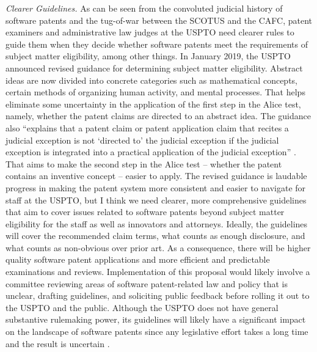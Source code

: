 \documentclass[12pt]{texMemo} %
\begin{document}
\textit{Clearer Guidelines.} \cite{lee} As can be seen from the convoluted judicial history of software patents and the tug-of-war between the SCOTUS and the CAFC, patent examiners and administrative law judges at the USPTO need clearer rules to guide them when they decide whether software patents meet the requirements of subject matter eligibility, among other things. In January 2019, the USPTO announced revised guidance for determining subject matter eligibility. Abstract ideas are now divided into concrete categories such as mathematical concepts, certain methods of organizing human activity, and mental processes. That helps eliminate some uncertainty in the application of the first step in the Alice test, namely, whether the patent claims are directed to an abstract idea. The guidance also “explains that a patent claim or patent application claim that recites a judicial exception is not ‘directed to’ the judicial exception if the judicial exception is integrated into a practical application of the judicial exception” \cite{subject-matter}. That aims to make the second step in the Alice test -- whether the patent contains an inventive concept -- easier to apply. The revised guidance is laudable progress in making the patent system more consistent and easier to navigate for staff at the USPTO, but I think we need clearer, more comprehensive guidelines that aim to cover issues related to software patents beyond subject matter eligibility for the staff as well as innovators and attorneys. Ideally, the guidelines will cover the recommended claim terms, what counts as enough disclosure, and what counts as non-obvious over prior art. As a consequence, there will be higher quality software patent applications and more efficient and predictable examinations and reviews. Implementation of this proposal would likely involve a committee reviewing areas of software patent-related law and policy that is unclear, drafting guidelines, and soliciting public feedback before rolling it out to the USPTO and the public. Although the USPTO does not have general substantive rulemaking power, its guidelines will likely have a significant impact on the landscape of software patents since any legislative effort takes a long time and the result is uncertain \cite{iancu}.
\end{document}
